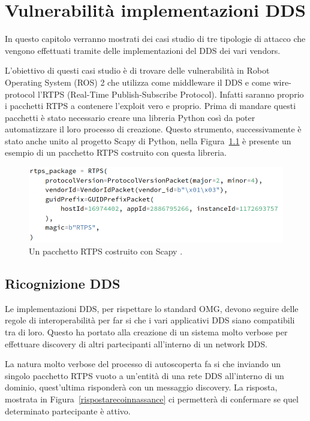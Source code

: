 \chapter{Vulnerabilità implementazioni DDS}
\label{chvulimpldds}

In questo capitolo verranno mostrati dei casi studio
di tre tipologie di 
attacco che vengono effettuati tramite delle 
implementazioni del DDS dei vari vendors.

L'obiettivo di questi casi studio è di trovare delle 
vulnerabilità in Robot Operating System (ROS) 2 che 
utilizza come middleware il DDS e come wire-protocol 
l'RTPS (Real-Time Publish-Subscribe Protocol).
Infatti saranno proprio i pacchetti RTPS a contenere 
l'exploit vero e proprio. Prima di mandare questi 
pacchetti è stato necessario creare una libreria Python 
così da poter automatizzare il loro processo di creazione.
Questo strumento, successivamente è stato anche unito al 
progetto Scapy di Python, nella 
Figura~\ref{rptspacketheaderscapy} è presente un esempio 
di un pacchetto RTPS costruito con questa libreria.

\begin{figure}[H]
    \centering
    \includegraphics[width=15.2cm, keepaspectratio]{img/rptspacketheaderscapy.png}
    \caption{Un pacchetto RTPS costruito 
    con Scapy \cite{mayoral2022robot}.}
    \label{rptspacketheaderscapy}
\end{figure}

\section{Ricognizione DDS}
Le implementazioni DDS, per rispettare lo standard 
OMG, devono seguire delle regole di interoperabilità 
per far si che i vari applicativi DDS siano compatibili 
tra di loro. Questo ha portato alla creazione di un sistema
molto verbose per effettuare discovery 
di altri partecipanti all'interno di un network DDS.


La natura molto verbose del processo di autoscoperta 
fa si che inviando un singolo pacchetto RTPS vuoto 
a un'entità di una rete DDS all'interno di un dominio,
quest'ultima risponderà 
con un messaggio discovery. La risposta, mostrata
in Figura~\ref{rispostarecoinnassance} ci permetterà di 
confermare se quel determinato partecipante è attivo.

